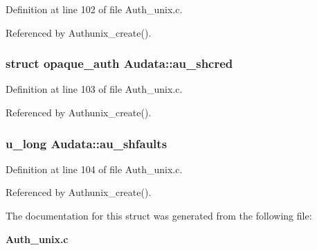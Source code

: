 Definition at line 102 of file Auth\_\-unix.c.

Referenced by Authunix\_\-create().
\subsubsection{\setlength{\rightskip}{0pt plus 5cm}struct opaque\_\-auth {\bf Audata::au\_\-shcred}}\label{structAudata_o1}




Definition at line 103 of file Auth\_\-unix.c.

Referenced by Authunix\_\-create().
\subsubsection{\setlength{\rightskip}{0pt plus 5cm}u\_\-long {\bf Audata::au\_\-shfaults}}\label{structAudata_o2}




Definition at line 104 of file Auth\_\-unix.c.

Referenced by Authunix\_\-create().

The documentation for this struct was generated from the following file:\begin{CompactItemize}
\item 
{\bf Auth\_\-unix.c}\end{CompactItemize}
